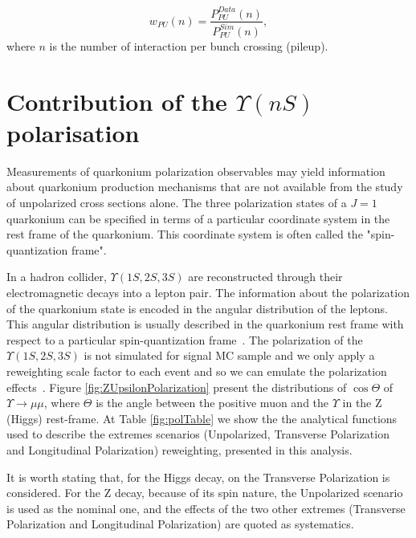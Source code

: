 \begin{equation}
\label{eqn:mc_weight}
w_{PU}(n) = \frac{P^{Data}_{PU}(n)}{P^{Sim}_{PU}(n)},
\end{equation}
where $n$ is the number of interaction per bunch crossing (pileup).

\section{Contribution of the \texorpdfstring{$\Upsilon(nS)$} p polarisation}
\label{sec:polarization}

Measurements of quarkonium polarization observables may yield information about quarkonium production mechanisms that are not available from the study of unpolarized cross sections alone. The three polarization states of a $J = 1$ quarkonium can be specified in terms of a particular coordinate system in the rest frame of the quarkonium. This coordinate system is often called the "spin-quantization frame". 

In a hadron collider, $\Upsilon(1S,2S,3S)$ are reconstructed through their electromagnetic decays into a lepton pair. The information about the polarization of the quarkonium state is encoded in the angular distribution of the leptons. This angular distribution is usually described in the quarkonium rest frame with respect to a particular spin-quantization frame~\cite{Brambilla:2011bph}. The polarization of the  $\Upsilon(1S,2S,3S)$ is not simulated for signal MC sample and we only apply a reweighting scale factor to each event and so we can emulate the polarization effects~\cite{PhysRevD.83.031503}. Figure \ref{fig:ZUpsilonPolarization} present the distributions of $\cos \Theta$ of $\Upsilon \rightarrow \mu\mu$, 
where $\Theta$ is the angle between the positive muon and the $\Upsilon$ in the Z (Higgs) rest-frame. At Table \ref{fig:polTable} we show the the analytical functions used to describe the extremes scenarios (Unpolarized, Transverse Polarization and Longitudinal Polarization) reweighting, presented in this analysis. 

It is worth stating that, for the Higgs decay, on the Transverse Polarization is considered. For the Z decay, because of its spin nature, the Unpolarized scenario is used as the nominal one, and the effects of the two other extremes (Transverse Polarization and Longitudinal Polarization) are quoted as systematics.




